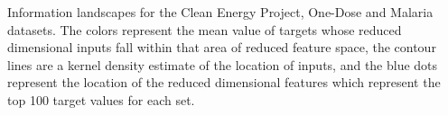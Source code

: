 Information landscapes for the Clean Energy Project, One-Dose and Malaria datasets.  The colors represent the mean value of targets whose reduced dimensional inputs fall within that area of reduced feature space, the contour lines are a kernel density estimate of the location of inputs, and the blue dots represent the location of the reduced dimensional features which represent the top 100 target values for each set.
\label{fig:info_landscapes}
